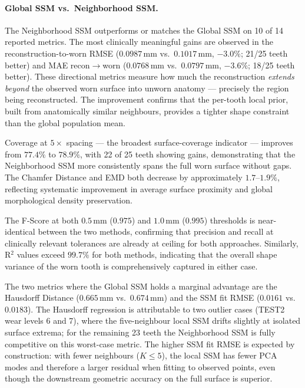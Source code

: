 \documentclass[11pt,a4paper]{article}
\begin{document}
\paragraph{Global SSM vs.\ Neighborhood SSM.}
The Neighborhood SSM outperforms or matches the Global SSM on 10 of
14 reported metrics.  The most clinically meaningful gains are
observed in the reconstruction-to-worn RMSE
($0.0987\,\text{mm}$ vs.\ $0.1017\,\text{mm}$, $-3.0\%$;
21/25 teeth better) and MAE recon$\to$worn
($0.0768\,\text{mm}$ vs.\ $0.0797\,\text{mm}$, $-3.6\%$;
18/25 teeth better).  These directional metrics measure how much
the reconstruction \emph{extends beyond} the observed worn surface
into unworn anatomy — precisely the region being reconstructed.
The improvement confirms that the per-tooth local prior, built from
anatomically similar neighbours, provides a tighter shape constraint
than the global population mean.

Coverage at $5\times$ spacing — the broadest surface-coverage
indicator — improves from $77.4\%$ to $78.9\%$, with 22 of 25
teeth showing gains, demonstrating that the Neighborhood SSM more
consistently spans the full worn surface without gaps.  The
Chamfer Distance and EMD both decrease by approximately $1.7$--$1.9\%$,
reflecting systematic improvement in average surface proximity and
global morphological density preservation.

The F-Score at both $0.5\,\text{mm}$ ($0.975$) and
$1.0\,\text{mm}$ ($0.995$) thresholds is near-identical between
the two methods, confirming that precision and recall at
clinically relevant tolerances are already at ceiling for both
approaches.  Similarly, R$^2$ values exceed $99.7\%$ for both
methods, indicating that the overall shape variance of the worn
tooth is comprehensively captured in either case.

The two metrics where the Global SSM holds a marginal advantage
are the Hausdorff Distance ($0.665\,\text{mm}$ vs.\
$0.674\,\text{mm}$) and the SSM fit RMSE ($0.0161$ vs.\ $0.0183$).
The Hausdorff regression is attributable to two outlier cases
(TEST2 wear levels 6 and 7), where the five-neighbour local SSM
drifts slightly at isolated surface extrema; for the remaining 23
teeth the Neighborhood SSM is fully competitive on this worst-case
metric.  The higher SSM fit RMSE is expected by construction: with
fewer neighbours ($K\!\leq\!5$), the local SSM has fewer PCA modes
and therefore a larger residual when fitting to observed points,
even though the downstream geometric accuracy on the full surface
is superior.
\end{document}
